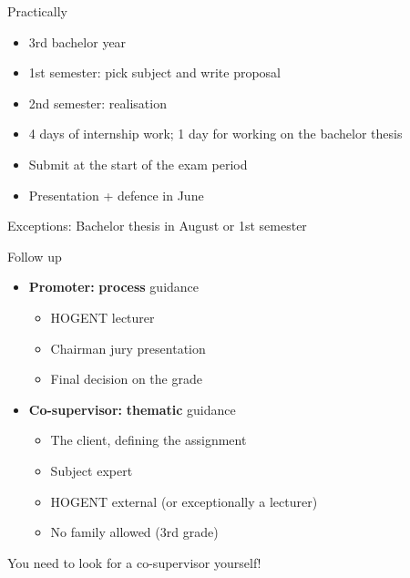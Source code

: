 \documentclass[aspectratio=169]{beamer}
\begin{document}
    \begin{frame}{Practically}
        
        \begin{itemize}
            \item 3rd bachelor year 
            \item 1st semester: pick subject and write proposal
            \item 2nd semester: realisation
            \item 4 days of internship work; 1 day for working on the bachelor thesis
            \item Submit at the start of the exam period
            \item Presentation + defence in June
        \end{itemize}
        
        \bigskip
        
        Exceptions: Bachelor thesis in August or 1st semester
    \end{frame}
    
    \begin{frame}{Follow up}
        
        \begin{itemize}
            \item \textbf{Promoter:} \textbf{process} guidance
            \begin{itemize}
                \item HOGENT lecturer
                \item Chairman jury presentation
                \item Final decision on the grade
            \end{itemize}
            \item \textbf{Co-supervisor:} \textbf{thematic} guidance
            \begin{itemize}
                \item The client, defining the assignment 
                \item Subject expert
                \item HOGENT external (or exceptionally a lecturer)
                \item No family allowed (3rd grade)
            \end{itemize}
        \end{itemize}
        
        \bigskip
        
        You need to look for a co-supervisor yourself!
        
    \end{frame}
    
\end{document}
